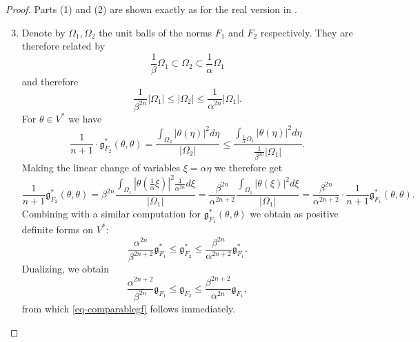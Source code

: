 \documentclass[a4paper,11pt,reqno]{amsart}
\theoremstyle{plain}
\theoremstyle{definition}
\theoremstyle{remark}
\theoremstyle{remark}
\numberwithin{equation}{section}
\newcommand{\abs}[1]{\left\vert#1\right\vert}
\newcommand{\g}{\mathfrak{g}}
\begin{document}
\begin{proof}
  Parts (1) and (2) are shown exactly as for the real version in \cite[Proposition~12.1]{binet}. 
     \begin{enumerate}[wide]   \setcounter{enumi}{2}
    \item Denote by $\Omega_1, \Omega_2$ the unit balls of the norms $F_1$ and $F_2$ respectively. They  are therefore related by 
    \[\frac{1}{\beta} \Omega_1 \subset \Omega_2 \subset \frac{1}{\alpha}\Omega_1\]
    and therefore
    \[ \frac{1}{\beta^{2n}} \abs{\Omega_1}\leq \abs{\Omega_2}\leq \frac{1}{\alpha^{2n}} \abs{\Omega_1}. \]
    For $\theta\in V^*$ we have
    \begin{equation}
        \label{eq-ineq}
         \frac{1}{n+1}\cdot\g_{F_2}^*(\theta, \theta)=\frac{\int_{\Omega_2}\abs{\theta(\eta)}^2d\eta}{\abs{\Omega_2}}\leq \frac{\int_{\frac{1}{\alpha}\Omega_1}\abs{\theta(\eta)}^2d\eta }{\frac{1}{\beta^{2n}}\abs{\Omega_1}}.
    \end{equation}
Making the linear change of variables $\xi = \alpha \eta$ we therefore get
\[  \frac{1}{n+1}\g_{F_2}^*(\theta, \theta)= \beta^{2n}\frac{\int_{\Omega_1} \abs{\theta( \frac{1}{\alpha}\xi)}^2 \frac{1}{\alpha^{2n}}d\xi}{\abs{\Omega_1}}= \frac{\beta^{2n}}{\alpha^{2n+2}}\frac{\int_{\Omega_1} \abs{\theta( \xi)}^2 d\xi}{\abs{\Omega_1}}=\frac{\beta^{2n}}{\alpha^{2n+2}}\cdot \frac{1}{n+1}\g_{F_1}^*(\theta, \theta). \]
Combining with a similar computation for  $\g_{F_1}^*(\theta, \theta)$ we
obtain as positive definite forms on $V^*$:
\[ \frac{\alpha^{2n}}{\beta^{2n+2}}\g_{F_1}^* \leq \g_{F_2}^* \leq  \frac{\beta^{2n}}{\alpha^{2n+2}}\g_{F_1}^*.\]
Dualizing, we obtain 
\begin{equation*}
    \frac{\alpha^{2n+2}}{\beta^{2n}} \g_{F_1} \leq \g_{F_2}\leq \frac{\beta^{2n+2}}{\alpha^{2n}}\g_{F_1},
\end{equation*}
from which  \eqref{eq-comparablegf} follows immediately.


\end{enumerate}
\end{proof}
\end{document}
